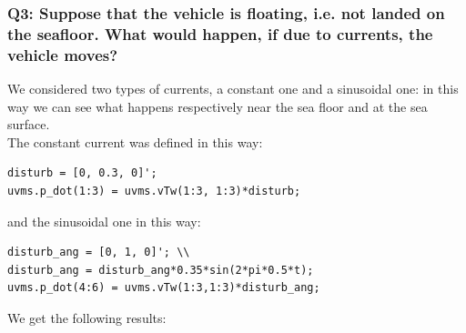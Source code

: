 \documentclass{article}
\begin{document}
\subsubsection{Q3: Suppose that the vehicle is floating, i.e. not landed on the seafloor. What would happen, if due to currents, the vehicle moves?}
We considered two types of currents, a constant one and a sinusoidal one: in this way we can see what happens respectively near the sea floor and at the sea surface.\\
The constant current was defined in this way:
\begin{lstlisting}
disturb = [0, 0.3, 0]';
uvms.p_dot(1:3) = uvms.vTw(1:3, 1:3)*disturb;
\end{lstlisting}
and the sinusoidal one in this way:
\begin{lstlisting}
disturb_ang = [0, 1, 0]'; \\
disturb_ang = disturb_ang*0.35*sin(2*pi*0.5*t);
uvms.p_dot(4:6) = uvms.vTw(1:3,1:3)*disturb_ang;
\end{lstlisting}
We get the following results:
\begin{figure}[H]
	\centering
	\hspace{10mm}
	\label{fig:ex4.1.3ConstantCurrent}
\end{figure}
\end{document}
